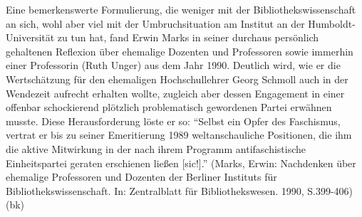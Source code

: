 \documentclass[a4paper,
fontsize=11pt,
oneside,
numbers=noperiodatend,
parskip=half-,
bibliography=totoc,
final
]{scrartcl}
\begin{document}
Eine bemerkenswerte Formulierung, die weniger mit der
Bibliothekswissenschaft an sich, wohl aber viel mit der Umbruchsituation
am Institut an der Humboldt-Universität zu tun hat, fand Erwin Marks in
seiner durchaus persönlich gehaltenen Reflexion über ehemalige Dozenten
und Professoren sowie immerhin einer Professorin (Ruth Unger) aus dem
Jahr 1990. Deutlich wird, wie er die Wertschätzung für den ehemaligen
Hochschullehrer Georg Schmoll auch in der Wendezeit aufrecht erhalten
wollte, zugleich aber dessen Engagement in einer offenbar schockierend
plötzlich problematisch gewordenen Partei erwähnen musste. Diese
Herausforderung löste er so: \enquote{Selbst ein Opfer des Faschismus,
vertrat er bis zu seiner Emeritierung 1989 weltanschauliche Positionen,
die ihm die aktive Mitwirkung in der nach ihrem Programm
antifaschistische Einheitspartei geraten erschienen ließen {[}sic!{]}.}
(Marks, Erwin: Nachdenken über ehemalige Professoren und Dozenten der
Berliner Instituts für Bibliothekswissenschaft. In: Zentralblatt für
Bibliothekswesen. 1990, S.399-406) (bk)

\end{document}
